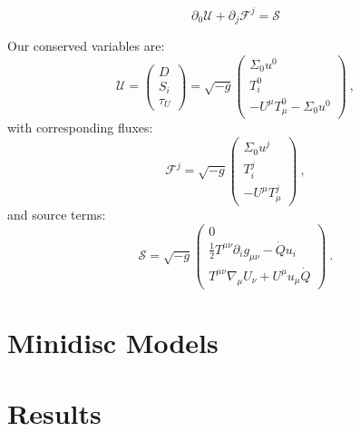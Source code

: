 \documentclass{emulateapj}
\newcommand{\Sig}{\Sigma}
\newcommand{\pd}{\partial}
\begin{document}
\begin{equation}
    \pd_0 \mathcal{U} + \pd_j \mathcal{F}^j = \mathcal{S}
\end{equation}

Our conserved variables are:
\begin{equation}
    \mathcal{U} = \begin{pmatrix} D \\
                            S_i \\
                            \tau_U
                \end{pmatrix} = \sqrt{-g} \begin{pmatrix} \Sig_0 u^0 \\ 
                                                    T^0_i \\
                                                    -U^\mu T_\mu^0 - \Sig_0 u^0 \end{pmatrix} \ , \label{eq:cons}
\end{equation}
with corresponding fluxes:
\begin{equation}
    \mathcal{F}^j = \sqrt{-g} \begin{pmatrix} \Sig_0 u^j \\
                                                T^j_i \\
                                                -U^\mu T_\mu^j \end{pmatrix} \ ,\label{eq:fluxes}
\end{equation}
and source terms:
\begin{equation}
    \mathcal{S} = \sqrt{-g} \begin{pmatrix} 0 \\
                        \frac{1}{2}T^{\mu\nu}\pd_i g_{\mu\nu} - \dot{Q}u_i \\
                        T^{\mu\nu}\nabla_\mu U_\nu + U^\mu u_\mu \dot{Q} \end{pmatrix} \ .\label{eq:sources}
\end{equation}



\section{Minidisc Models}
\label{sec:models}




\section{Results}
\label{sec:results}
\end{document}
